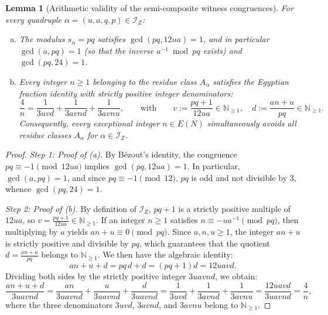 \documentclass[11pt, a4paper]{article}
\theoremstyle{plain}
\newtheorem{lemma}[theorem]{Lemma}
\theoremstyle{definition}
\newcommand{\N}{\mathbb{N}}
\begin{document}
\begin{lemma}[Arithmetic validity of the semi-composite witness congruences]\label{lem:validite_temoins}
For every quadruple $\alpha = (u,a,q,p) \in \mathcal{I}_Z$:
\begin{enumerate}[(a)]
    \item The modulus $s_\alpha = pq$ satisfies $\gcd(pq, 12ua) = 1$, and in particular $\gcd(a, pq) = 1$ (so that the inverse $a^{-1} \bmod{pq}$ exists) and $\gcd(pq, 24) = 1$.
    \item Every integer $n \ge 1$ belonging to the residue class $A_\alpha$ satisfies the Egyptian fraction identity with strictly positive integer denominators:
    \begin{equation}\label{eq:decomp_ES_pq}
    \frac{4}{n} = \frac{1}{3uvd} + \frac{1}{3avnd} + \frac{1}{3avnu}, \qquad \text{with} \qquad v := \frac{pq+1}{12ua} \in \N_{\ge 1}, \quad d := \frac{an+u}{pq} \in \N_{\ge 1}.
    \end{equation}
    Consequently, every exceptional integer $n \in E(N)$ simultaneously avoids all residue classes $A_\alpha$ for $\alpha \in \mathcal{I}_Z$.
\end{enumerate}
\end{lemma}
\begin{proof}
\emph{Step 1: Proof of (a).}
By Bézout's identity, the congruence $pq \equiv -1 \pmod{12ua}$ implies $\gcd(pq, 12ua) = 1$. In particular, $\gcd(a, pq) = 1$, and since $pq \equiv -1 \pmod{12}$, $pq$ is odd and not divisible by $3$, whence $\gcd(pq, 24) = 1$.

\medskip\noindent\emph{Step 2: Proof of (b).}
By definition of $\mathcal{I}_Z$, $pq + 1$ is a strictly positive multiple of $12ua$, so $v = \frac{pq+1}{12ua} \in \N_{\ge 1}$. If an integer $n \ge 1$ satisfies $n \equiv -u a^{-1} \pmod{pq}$, then multiplying by $a$ yields $an + u \equiv 0 \pmod{pq}$. Since $a, n, u \ge 1$, the integer $an + u$ is strictly positive and divisible by $pq$, which guarantees that the quotient $d = \frac{an+u}{pq}$ belongs to $\N_{\ge 1}$. We then have the algebraic identity:
\[
an + u + d = pq\,d + d = (pq + 1)d = 12uavd.
\]
Dividing both sides by the strictly positive integer $3uavnd$, we obtain:
\[
\frac{an + u + d}{3uavnd} = \frac{an}{3uavnd} + \frac{u}{3uavnd} + \frac{d}{3uavnd} = \frac{1}{3uvd} + \frac{1}{3avnd} + \frac{1}{3avnu} = \frac{12uavd}{3uavnd} = \frac{4}{n},
\]
where the three denominators $3uvd$, $3avnd$, and $3avnu$ belong to $\N_{\ge 1}$.
\end{proof}
\end{document}
